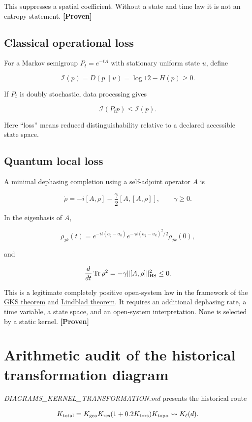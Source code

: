 \documentclass[11pt,a4paper,openany]{report}
\newcommand{\statusProven}{\textcolor{fingreen}{[Proven]}}
\begin{document}
This suppresses a spatial coefficient. Without a state and time law it is not an entropy statement. \textbf{\statusProven{}}

\subsection{Classical operational loss}

For a Markov semigroup \(P_t=e^{-tA}\) with stationary uniform state \(u\), define

\[
\mathcal I(p)=D(p\|u)=\log12-H(p)\ge0.
\]

If \(P_t\) is doubly stochastic, data processing gives

\[
\mathcal I(P_tp)\le\mathcal I(p).
\]

Here “loss” means reduced distinguishability relative to a declared accessible state space.

\subsection{Quantum local loss}

A minimal dephasing completion using a self-adjoint operator \(A\) is

\[
\dot\rho
=-i[A,\rho]
-\frac\gamma2[A,[A,\rho]],
\qquad \gamma\ge0.
\]

In the eigenbasis of \(A\),

\[
\rho_{jk}(t)
=e^{-it(a_j-a_k)}
e^{-\gamma t(a_j-a_k)^2/2}\rho_{jk}(0),
\]

and

\[
\frac{d}{dt}\operatorname{Tr}\rho^2
=-\gamma\|[A,\rho]\|_{\rm HS}^2\le0.
\]

This is a legitimate completely positive open-system law in the framework of the \href{https://doi.org/10.1063/1.522979}{GKS theorem} and \href{https://doi.org/10.1007/BF01608499}{Lindblad theorem}. It requires an additional dephasing rate, a time variable, a state space, and an open-system interpretation. None is selected by a static kernel. \textbf{\statusProven{}}

\section{Arithmetic audit of the historical transformation diagram}

\emph{DIAGRAMS\_KERNEL\_TRANSFORMATION.md} presents the historical route

\[
K_{\rm total}
=K_{\rm geo}K_{\rm res}(1+0.2K_{\rm tors})K_{\rm topo}
\leadsto K_\ell(d).
\]
\end{document}
